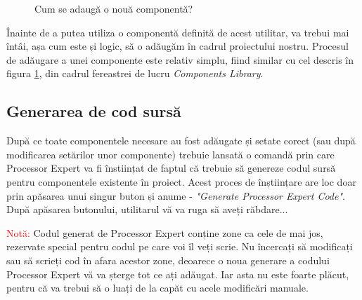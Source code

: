 \begin{figure}
    \vspace{-30pt}
    \vspace{-20pt}
    \caption{\label{fig:CodeWarrior-ProcessorExpertAdd} Cum se adaugă o nouă componentă?}
    \vspace{-10pt}
\end{figure}

Înainte de a putea utiliza o componentă definită de acest utilitar, va trebui mai întâi, așa cum este și logic, să o adăugăm în cadrul proiectului nostru. Procesul de adăugare a unei componente este relativ simplu, fiind similar cu cel descris în figura \ref{fig:CodeWarrior-ProcessorExpertAdd}, din cadrul fereastrei de lucru \textit{Components Library}.

\subsection{Generarea de cod sursă}

După ce toate componentele necesare au fost adăugate și setate corect (sau după modificarea setărilor unor componente) trebuie lansată o comandă prin care Processor Expert va fi înstiințat de faptul că trebuie să genereze codul sursă pentru componentele existente în proiect. Acest proces de înștiințare are loc doar prin apăsarea unui singur buton și anume - \textit{"Generate Processor Expert Code"}. După apăsarea butonului, utilitarul vă va ruga să aveți răbdare...

\textcolor{red}{Notă:} Codul generat de Processor Expert conține zone ca cele de mai jos, rezervate special pentru codul pe care voi îl veți scrie. Nu încercați să modificați sau să scrieți cod în afara acestor zone, deoarece o noua generare a codului Processor Expert vă va șterge tot ce ați adăugat. Iar asta nu este foarte plăcut, pentru că va trebui să o luați de la capăt cu acele modificări manuale.

\newpage

